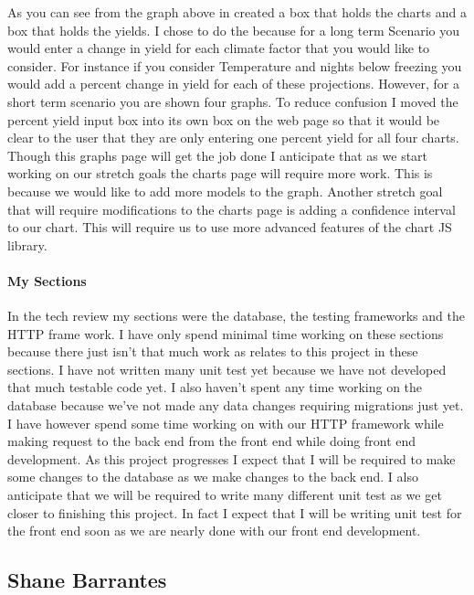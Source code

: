 \documentclass[onecolumn, draftclsnofoot,10pt, compsoc]{article}
\begin{document}
As you can see from the graph above in created a box that holds the charts and a box that holds the yields. I chose to do the because for a long term Scenario you would enter a change in yield for each climate factor that you would like to consider. For instance if you consider Temperature and nights below freezing you would add a percent change in yield for each of these projections. However, for a short term scenario you are shown four graphs. To reduce confusion I moved the percent yield input box into its own box on the web page so that it would be clear to the user that they are only entering one percent yield for all four charts. Though this graphs page will get the job done I anticipate that as we start working on our stretch goals the charts page will require more work. This is because we would like to add more models to the graph. Another stretch goal that will require modifications to the charts page is adding a confidence interval to our chart. This will require us to use more advanced features of the chart JS library.\\ 

 		\paragraph{My Sections} \hfill \break
		In the tech review my sections were the database, the testing frameworks and the HTTP frame work. I have only spend minimal time working on these sections because there just isn't that much work as relates to this project in these sections. I have not written many unit test yet because we have not developed that much testable code yet. I also haven’t spent any time working on the database because we've not made any data changes requiring migrations just yet. I have however spend some time working on with our HTTP framework while making request to the back end from the front end while doing front end development. As this project progresses I expect that I will be required to make some changes to the database as we make changes to the back end. I also anticipate that we will be required to write many different unit test as we get closer to finishing this project. In fact I expect that I will be writing unit test for the front end soon as we are nearly done with our front end development.\\


\subsection{Shane Barrantes}
\end{document}
